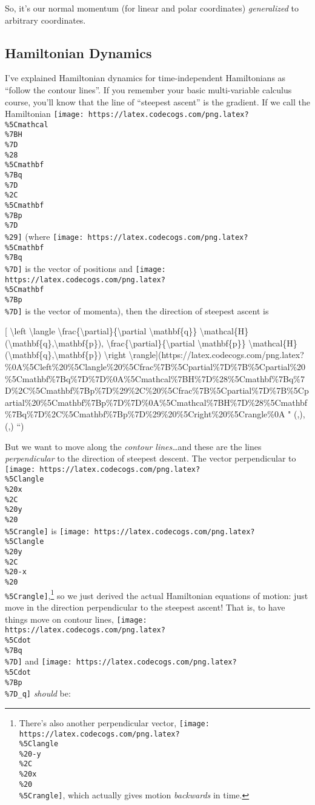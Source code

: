 \documentclass[]{article}
\begin{document}
So, it's our normal momentum (for linear and polar coordinates)
\emph{generalized} to arbitrary coordinates.

\subsection{Hamiltonian Dynamics}\label{hamiltonian-dynamics}

I've explained Hamiltonian dynamics for time-independent Hamiltonians as
``follow the contour lines''. If you remember your basic multi-variable calculus
course, you'll know that the line of ``steepest ascent'' is the gradient. If we
call the Hamiltonian
\texttt{[image: https://latex.codecogs.com/png.latex?\\\%5Cmathcal\\\%7BH\\\%7D\\\%28\\\%5Cmathbf\\\%7Bq\\\%7D\\\%2C\\\%5Cmathbf\\\%7Bp\\\%7D\\\%29]}
(where
\texttt{[image: https://latex.codecogs.com/png.latex?\\\%5Cmathbf\\\%7Bq\\\%7D]} is
the vector of positions and
\texttt{[image: https://latex.codecogs.com/png.latex?\\\%5Cmathbf\\\%7Bp\\\%7D]} is
the vector of momenta), then the direction of steepest ascent is

{[} \textbackslash{}left \textbackslash{}langle
\textbackslash{}frac\{\textbackslash{}partial\}\{\textbackslash{}partial
\textbackslash{}mathbf\{q\}\}
\textbackslash{}mathcal\{H\}(\textbackslash{}mathbf\{q\},\textbackslash{}mathbf\{p\}),
\textbackslash{}frac\{\textbackslash{}partial\}\{\textbackslash{}partial
\textbackslash{}mathbf\{p\}\}
\textbackslash{}mathcal\{H\}(\textbackslash{}mathbf\{q\},\textbackslash{}mathbf\{p\})
\textbackslash{}right
\textbackslash{}rangle{]}(https://latex.codecogs.com/png.latex?\%0A\%5Cleft\%20\%5Clangle\%20\%5Cfrac\%7B\%5Cpartial\%7D\%7B\%5Cpartial\%20\%5Cmathbf\%7Bq\%7D\%7D\%0A\%5Cmathcal\%7BH\%7D\%28\%5Cmathbf\%7Bq\%7D\%2C\%5Cmathbf\%7Bp\%7D\%29\%2C\%20\%5Cfrac\%7B\%5Cpartial\%7D\%7B\%5Cpartial\%20\%5Cmathbf\%7Bp\%7D\%7D\%0A\%5Cmathcal\%7BH\%7D\%28\%5Cmathbf\%7Bq\%7D\%2C\%5Cmathbf\%7Bp\%7D\%29\%20\%5Cright\%20\%5Crangle\%0A
" \left \langle {}
(,), 
(,) \right \rangle
``)

But we want to move along the \emph{contour lines}\ldots{}and these are the
lines \emph{perpendicular} to the direction of steepest descent. The vector
perpendicular to
\texttt{[image: https://latex.codecogs.com/png.latex?\\\%5Clangle\\\%20x\\\%2C\\\%20y\\\%20\\\%5Crangle]}
is
\texttt{[image: https://latex.codecogs.com/png.latex?\\\%5Clangle\\\%20y\\\%2C\\\%20-x\\\%20\\\%5Crangle]},\footnote{There's
  also another perpendicular vector,
  \texttt{[image: https://latex.codecogs.com/png.latex?\\\%5Clangle\\\%20-y\\\%2C\\\%20x\\\%20\\\%5Crangle]},
  which actually gives motion \emph{backwards} in time.} so we just derived the
actual Hamiltonian equations of motion: just move in the direction perpendicular
to the steepest ascent! That is, to have things move on contour lines,
\texttt{[image: https://latex.codecogs.com/png.latex?\\\%5Cdot\\\%7Bq\\\%7D]} and
\texttt{[image: https://latex.codecogs.com/png.latex?\\\%5Cdot\\\%7Bp\\\%7D\_q]}
\emph{should} be:
\end{document}

